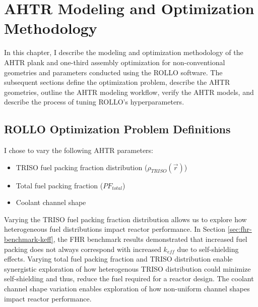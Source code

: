 \chapter{AHTR Modeling and Optimization Methodology}
\glsresetall
\label{chap:method}
In this chapter, I describe the modeling and optimization methodology of the 
\gls{AHTR} plank and one-third assembly optimization for non-conventional 
geometries and parameters conducted using the \gls{ROLLO} software.
The subsequent sections define the optimization problem, describe the 
\gls{AHTR} geometries, outline the \gls{AHTR} modeling workflow, verify the \gls{AHTR} 
models, and describe the process of tuning \gls{ROLLO}'s hyperparameters. 

\section{ROLLO Optimization Problem Definitions}
\label{sec:opt-problem}
I chose to vary the following \gls{AHTR} parameters: 
\begin{itemize}
    \item \gls{TRISO} fuel packing fraction distribution ($\rho_{TRISO}(\vec{r})$)
    \item Total fuel packing fraction ($PF_{total}$)
    \item Coolant channel shape
\end{itemize} 
Varying the \gls{TRISO} fuel packing fraction distribution allows us to explore how 
heterogeneous fuel distributions impact reactor performance.
In Section \ref{sec:fhr-benchmark-keff}, the \gls{FHR} benchmark results demonstrated 
that increased fuel packing does not always correspond with increased $k_{eff}$ due to 
self-shielding effects. 
Varying total fuel packing fraction and TRISO distribution enable synergistic
exploration of how heterogenous TRISO distribution could minimize self-shielding and 
thus, reduce the fuel required for a reactor design. 
The coolant channel shape variation enables exploration of how non-uniform 
channel shapes impact reactor performance. 


